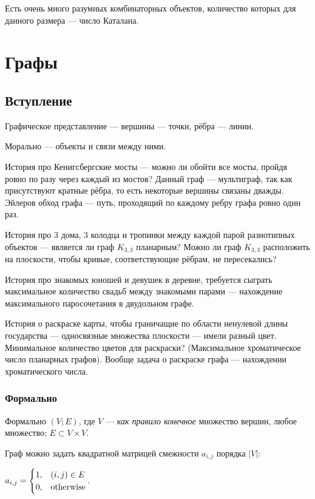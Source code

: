 \documentclass[a4paper]{report}
\begin{document}
    Есть очень много разумных комбинаторных объектов, количество которых для данного размера --- число Каталана.


    \chapter{Графы}


    \section{Вступление}
    Графическое представление --- вершины --- точки, рёбра --- линии.

    Морально --- объекты и связи между ними.

    История про Кенигсбергские мосты --- можно ли обойти все мосты, пройдя ровно по разу через каждый из мостов?  Данный граф --- мультиграф, так как присутствуют кратные рёбра, то есть некоторые вершины связаны дважды.
    Эйлеров обход графа --- путь, проходящий по каждому ребру графа ровно один раз.

    История про 3 дома, 3 колодца и тропинки между каждой парой разнотипных объектов --- является ли граф $K_{3,3}$ планарным?
    Можно ли граф $K_{3,3}$ расположить на плоскости, чтобы кривые, соответствующие рёбрам, не пересекались?

    История про знакомых юношей и девушек в деревне, требуется сыграть максимальное количество свадьб между знакомыми парами --- нахождение максимального паросочетания в двудольном графе.

    История о раскраске карты, чтобы граничащие по области ненулевой длины государства --- односвязные множества плоскости --- имели разный цвет.
    Минимальное количество цветов для раскраски? (Максимальное хроматическое число планарных графов).
    Вообще задача о раскраске графа --- нахождении хроматического числа.

    \subsection{Формально}
    Формально $(V; E)$, где $V$ --- \emph{как правило конечное} множество вершин, любое множество; $E \subset V \times V$.

    Граф можно задать квадратной матрицей смежности $a_{i,j}$ порядка $|V|$:

    $a_{i,j}=\begin{cases}1,&(i,j)\in E\\0, &\text{otherwise}\end{cases}$.
\end{document}
